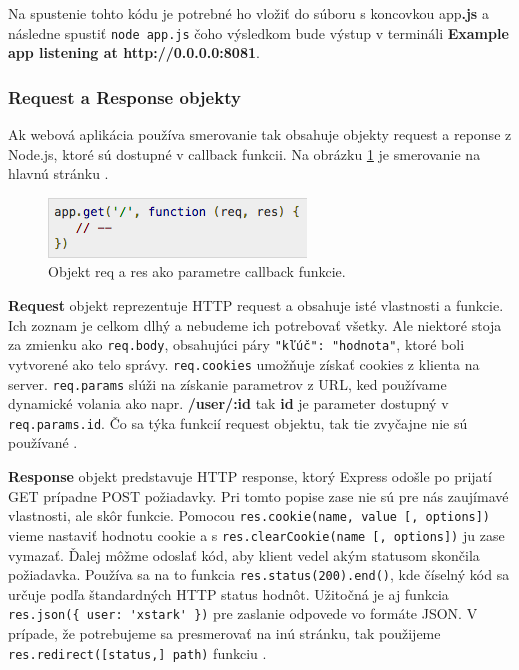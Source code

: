 Na spustenie tohto kódu je potrebné ho vložiť do súboru s koncovkou app\textbf{.js} a následne spustiť \verb|node app.js| čoho výsledkom bude výstup v termináli \textbf{Example app listening at http://0.0.0.0:8081}.

\subsubsection{Request a Response objekty}
Ak webová aplikácia používa smerovanie tak obsahuje objekty request a reponse z Node.js, ktoré sú dostupné v callback funkcii. Na obrázku \ref{express-res-req} je smerovanie na hlavnú stránku \cite{express-tutorial}.

\begin{figure}[H]
  \centering
  \includegraphics[scale=0.7]{img/express/express-req.png}
  \caption{Objekt req a res ako parametre callback funkcie.}
  \label{express-res-req}
\end{figure}

\textbf{Request} objekt reprezentuje HTTP request a obsahuje isté vlastnosti a funkcie. Ich zoznam je celkom dlhý a nebudeme ich potrebovať všetky. Ale niektoré stoja za zmienku ako \verb|req.body|, obsahujúci páry \verb|"kľúč": "hodnota"|, ktoré boli vytvorené ako telo správy. \verb|req.cookies| umožňuje získať cookies z klienta na server. \verb|req.params| slúži na získanie parametrov z URL, ked používame dynamické volania ako napr. \textbf{/user/:id} tak \textbf{id} je parameter dostupný v \verb|req.params.id|. Čo sa týka funkcií request objektu, tak tie zvyčajne nie sú používané \cite{nodejs-exp-request}.

\textbf{Response} objekt predstavuje HTTP response, ktorý Express odošle po prijatí GET prípadne POST požiadavky. Pri tomto popise zase nie sú pre nás zaujímavé vlastnosti, ale skôr funkcie. Pomocou \verb|res.cookie(name, value [, options])| vieme nastaviť hodnotu cookie a s \verb|res.clearCookie(name [, options])| ju zase vymazať. Ďalej môžme odoslať kód, aby klient vedel akým statusom skončila požiadavka. Používa sa na to funkcia \verb|res.status(200).end()|, kde číselný kód sa určuje podľa štandardných HTTP status hodnôt. Užitočná je aj funkcia \verb|res.json({ user: 'xstark' })| pre zaslanie odpovede vo formáte JSON. V prípade, že potrebujeme sa presmerovať na inú stránku, tak použijeme \verb|res.redirect([status,] path)| funkciu \cite{nodejs-exp-response}.

